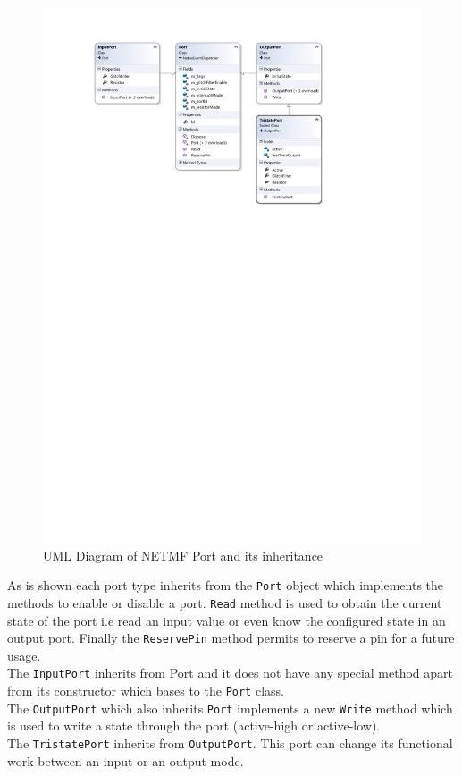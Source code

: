\begin{figure}[H]\begin{center}
 \centering
  \captionsetup{justification=centering}
  \includegraphics[width=1\textwidth]{pictures/iosharp/gpio}
  \caption{UML Diagram of NETMF Port and its inheritance \label{fig:gpio-uml}}
\end{center}\end{figure}

As is shown each port type inherits from the \verb!Port! object which implements the methods to enable or disable a port. \verb!Read! method is used to obtain the current state of the port i.e read an input value or even know the configured state in an output port. Finally the \verb!ReservePin! method permits to reserve a pin for a future usage.
\\
The \verb!InputPort! inherits from Port and it does not have any special method apart from its constructor which bases to the \verb!Port! class. 
\\
The \verb!OutputPort! which also inherits \verb!Port! implements a new \verb!Write! method which is used to write a state through the port (active-high or active-low).
\\
The \verb!TristatePort! inherits from \verb!OutputPort!. This port can change its functional work between an input or an output mode.

